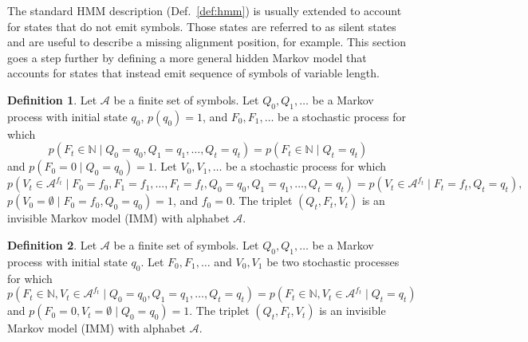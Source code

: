 \documentclass[a4paper]{article}
\theoremstyle{definition}
\theoremstyle{definition}
\newtheorem{definition}{Definition}[section]
\theoremstyle{definition}
\newcommand{\gv}{\;|\;}
\newcommand*{\field}[1]{\mathbb{#1}}%
\begin{document}
The standard HMM description (Def.~\ref{def:hmm}) is usually extended to account for states that do not emit symbols.
Those states are referred to as silent states and are useful to describe a missing alignment position, for example.
This section goes a step further by defining a more general hidden Markov model that accounts for states that instead
emit sequence of symbols of variable length.

\begin{definition}
Let $\mathcal A$ be a finite set of symbols.
Let $Q_0, Q_1, \dots$ be a Markov process with initial state $q_0$, $p(q_0) = 1$, and $F_0, F_1, \dots$ be a stochastic process for which
\begin{equation*}
    p(F_t\in\field{N}\gv Q_0=q_0, Q_1=q_1, \dots, Q_t=q_t) = p(F_t\in\field{N}\gv Q_t=q_t)
\end{equation*}
and $p(F_0=0\gv Q_0=q_0) = 1$.
Let $V_0, V_1, \dots$ be a stochastic process for which
\begin{equation*}
    p(V_t\in\mathcal A^{f_t}\gv F_0=f_0, F_1=f_1, \dots, F_t=f_t, Q_0=q_0, Q_1=q_1, \dots, Q_t=q_t)
        = p(V_t\in\mathcal A^{f_t}\gv F_t=f_t, Q_t=q_t),
\end{equation*}
$p(V_0=\emptyset\gv F_0=f_0, Q_0=q_0) = 1$, and $f_0=0$.
The triplet $(Q_t, F_t, V_t)$ is an invisible Markov model (IMM) with alphabet $\mathcal A$.
\end{definition}

\begin{definition}
Let $\mathcal A$ be a finite set of symbols.
Let $Q_0, Q_1, \dots$ be a Markov process with initial state $q_0$.
Let $F_0, F_1, \dots$ and $V_0, V_1$ be two stochastic processes for which
\begin{equation*}
    p(F_t\in\field{N}, V_t\in\mathcal A^{f_t} \gv Q_0=q_0, Q_1=q_1, \dots, Q_t=q_t)
    = p(F_t\in\field{N}, V_t\in\mathcal A^{f_t} \gv Q_t=q_t)
\end{equation*}
and $p(F_0=0, V_t=\emptyset \gv Q_0=q_0) = 1$.
The triplet $(Q_t, F_t, V_t)$ is an invisible Markov model (IMM) with alphabet $\mathcal A$.
\end{definition}
\end{document}
